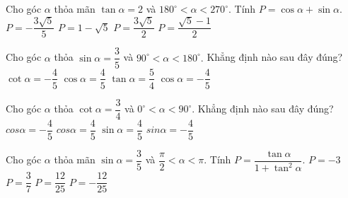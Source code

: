 \begin{ex}%
Cho góc $\alpha $ thỏa mãn $\tan \alpha =2$ và $180^{\circ}<\alpha <270^{\circ}.$ Tính $P=\cos \alpha+\sin \alpha.$
\choice
{\True $P=-\dfrac{{3\sqrt{5}}}{5}$}
{$P=1-\sqrt{5}$}
{$P=\dfrac{3\sqrt{5}}{2}$}
{$P=\dfrac{\sqrt{5}-1}{2}$}
\end{ex}

\begin{ex}%
Cho góc $\alpha $ thỏa $\sin \alpha =\dfrac{3}{5}$ và $90^{\circ}<\alpha <180^{\circ}.$ Khẳng định nào sau đây đúng?
\choice
{$\cot \alpha =-\dfrac{4}{5}$}
{$ \cos\alpha =\dfrac{4}{5}$}
{$\tan \alpha =\dfrac{5}{4}$}
{\True $ \cos\alpha =-\dfrac{4}{5}$}
\end{ex}

\begin{ex}%
Cho góc $\alpha $ thỏa $ \cot\alpha =\dfrac{3}{4}$ và $0^{\circ}<\alpha <90^{\circ}.$ Khẳng định nào sau đây đúng?
\choice
{$ cos\alpha =-\dfrac{4}{5}$}
{$ cos\alpha =\dfrac{4}{5}$}
{\True $\sin \alpha =\dfrac{4}{5}$}
{$ sin\alpha =-\dfrac{4}{5}$}
\end{ex}

\begin{ex}%
Cho góc $\alpha $ thỏa mãn $\sin \alpha =\dfrac{3}{5}$ và $\dfrac{\pi}{2}<\alpha <\pi $. Tính $P=\dfrac{{\tan \alpha}}{{1+{\tan}^2\alpha}}.$
\choice
{$P=-3$}
{$P=\dfrac{3}{7}$}
{$P=\dfrac{{12}}{{25}}$}
{\True $P=-\dfrac{{12}}{{25}}$}
\end{ex}

